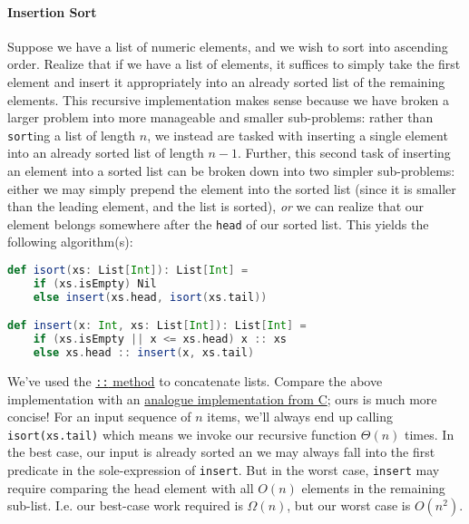 \documentclass[12pt,letterpaper,twoside]{article}
\begin{document}
\paragraph{Insertion Sort} Suppose we have a list of numeric elements, and we 
wish to sort into ascending order. Realize that if we have a list of elements,
it suffices to simply take the first element and insert it appropriately into
an already sorted list of the remaining elements. This recursive implementation makes
sense because we have broken a larger problem into more manageable and smaller
sub-problems: rather than \texttt{sort}ing a list of length $n$, we instead
are tasked with inserting a single element into an already sorted list of length
$n-1$. Further, this second task of inserting an element into a sorted list can be broken down into two simpler sub-problems: either we may simply prepend the element into the sorted list (since it is smaller than the leading element, and the list is sorted), 
\emph{or} we can realize that our element belongs somewhere after the \texttt{head} of our sorted list. This yields the following algorithm(s):

\begin{lstlisting}[language=Scala]
def isort(xs: List[Int]): List[Int] =
    if (xs.isEmpty) Nil
    else insert(xs.head, isort(xs.tail))

def insert(x: Int, xs: List[Int]): List[Int] = 
    if (xs.isEmpty || x <= xs.head) x :: xs
    else xs.head :: insert(x, xs.tail)  
\end{lstlisting}

We've used the \href{https://www.scala-lang.org/api/2.12.0/scala/collection/immutable/List.html#::(x:A):List[A]}{\texttt{::} method} to concatenate lists. Compare the above
implementation with an \href{https://en.wikipedia.org/wiki/Insertion_sort#List_insertion_sort_code_in_C}{analogue implementation from C}; ours is much more concise!
For an input
sequence of $n$ items, we'll always end up calling \texttt{isort(xs.tail)}
which means we invoke our recursive function $\Theta(n)$ times. In the best case,
our input is already sorted an we may always fall into the first predicate
in the sole-expression of \texttt{insert}. But in the worst case, \texttt{insert}
may require comparing the head element with all $O(n)$ elements in the remaining 
sub-list. I.e. our best-case
work required is $\Omega(n)$, but our worst case is $O(n^2)$.
\end{document}
